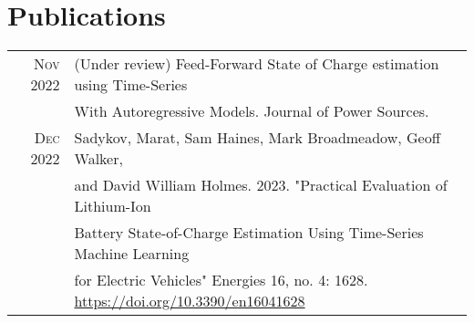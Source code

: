 \documentclass[a4paper,12pt]{article}
\begin{document}
{{\section{Publications}
\begin{tabular}{rl}
 \textsc{Nov} 2022 & (Under review) Feed-Forward State of Charge estimation using Time-Series \\
 & With Autoregressive Models. Journal of Power Sources. \\
 \textsc{Dec} 2022 & Sadykov, Marat, Sam Haines, Mark Broadmeadow, Geoff Walker, \\
 & and David William Holmes. 2023. "Practical Evaluation of Lithium-Ion \\
 & Battery State-of-Charge Estimation Using Time-Series Machine Learning \\
 & for Electric Vehicles" Energies 16, no. 4: 1628. \href{https://doi.org/10.3390/en16041628}{https://doi.org/10.3390/en16041628}
\end{tabular}
    } {}
}
{}
\end{document}
